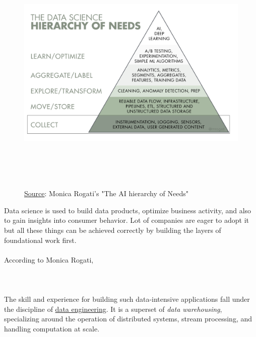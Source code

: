 \begin{figure}[h!]
  \centering
  \includegraphics[width=14cm,height=12cm,keepaspectratio]{../media/crawler/data_hierarchy.png}
  \caption{\underline{Source}: Monica Rogati's "The AI hierarchy of Needs"\cite{datasci}}
  \label{fig:datahierarchy}
\end{figure}

\noindent
Data science is used to build data products, optimize business activity, and also to gain insights into
consumer behavior. Lot of companies are eager to adopt it but all these things can be achieved correctly
by building the layers of foundational work first.
\\
\\
According to Monica Rogati,
\\
\\
\\
\\
\noindent
The skill and experience for building such data-intensive applications fall under the discipline of
\underline{data engineering}\cite{dataengr}. It is a superset of \textit{data warehousing}, specializing
around the operation of distributed systems, stream processing, and handling computation at scale.


\pagebreak

